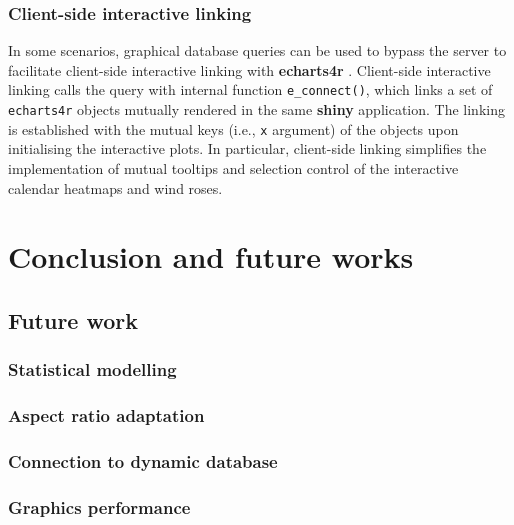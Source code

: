 \documentclass{aucklandthesis}
\begin{document}
\hypertarget{client-side-interactive-linking}{%
\subsection{Client-side interactive linking}\label{client-side-interactive-linking}}

In some scenarios, graphical database queries can be used to bypass the server to facilitate client-side interactive linking with \textbf{echarts4r} \autocite{echarts4r}. Client-side interactive linking calls the query with internal function \texttt{e\_connect()}, which links a set of \texttt{echarts4r} objects mutually rendered in the same \textbf{shiny} application. The linking is established with the mutual keys (i.e., \texttt{x} argument) of the objects upon initialising the interactive plots. In particular, client-side linking simplifies the implementation of mutual tooltips and selection control of the interactive calendar heatmaps and wind roses.

\hypertarget{ch:conclusion}{%
\chapter{Conclusion and future works}\label{ch:conclusion}}

\hypertarget{future-work}{%
\section{Future work}\label{future-work}}

\hypertarget{statistical-modelling}{%
\subsection{Statistical modelling}\label{statistical-modelling}}

\hypertarget{aspect-ratio-adaptation}{%
\subsection{Aspect ratio adaptation}\label{aspect-ratio-adaptation}}

\hypertarget{connection-to-dynamic-database}{%
\subsection{Connection to dynamic database}\label{connection-to-dynamic-database}}

\hypertarget{graphics-performance}{%
\subsection{Graphics performance}\label{graphics-performance}}
\end{document}
